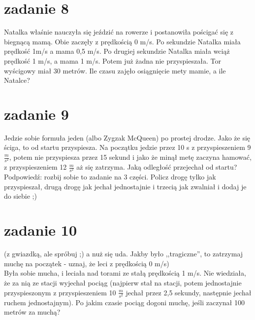 \documentclass{article}
\begin{document}
\section*{zadanie 8}
Natalka właśnie nauczyła się jeździć na rowerze i postanowiła pościgać się z biegnącą mamą. Obie zaczęły z prędkością 0 m/s. Po sekundzie Natalka miała prędkość 1m/s a mama 0,5 m/s. Po drugiej sekundzie Natalka miała wciąż prędkość 1 m/s, a mama 1 m/s. Potem już żadna nie przyspieszała. Tor wyścigowy miał 30 metrów. Ile czasu zajęło osiągnięcie mety mamie, a ile Natalce? 
\section*{zadanie 9}
Jedzie sobie formuła jeden (albo Zygzak McQueen) po prostej drodze. Jako że się ściga, to od startu przyspiesza. Na początku jedzie przez 10 s z przyspieszeniem 9 $\frac{m}{s^{2}}$, potem nie przyspiesza przez 15 sekund i jako że minął metę zaczyna hamować, z przyspieszeniem 12 $\frac{m}{s^{2}}$ aż się zatrzyma. Jaką odległość przejechał od startu?
\\Podpowiedź: rozbij sobie to zadanie na 3 części. Policz drogę tylko jak przyspieszał, drugą drogę jak jechał jednostajnie i trzecią jak zwalniał i dodaj je do siebie ;)
\section*{zadanie 10}(z gwiazdką, ale spróbuj ;) a nuż się uda. Jakby było ,,tragiczne'', to zatrzymaj muchę na początek - uznaj, że leci z prędkością 0 m/s)\\
Była sobie mucha, i leciała nad torami ze stałą prędkością 1 m/s. Nie wiedziała, że za nią ze stacji wyjechał pociąg (najpierw stał na stacji, potem jednostajnie przyspieszonym z przyspieszeniem 10 $\frac{m}{s^{2}}$ jechał przez 2,5 sekundy, następnie jechał ruchem jednostajnym). Po jakim czasie pociąg dogoni muchę, jeśli zaczynał 100 metrów za muchą?
\end{document}

